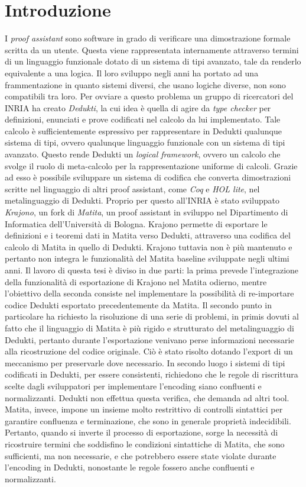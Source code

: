 \documentclass[12pt,a4paper]{report}
\begin{document}
\chapter*{Introduzione}
I \textit{proof assistant} sono software in grado di verificare una dimostrazione
formale scritta da un utente. Questa viene rappresentata internamente attraverso 
termini di un linguaggio funzionale dotato di un sistema di tipi avanzato, tale
da renderlo equivalente a una logica. Il loro sviluppo negli anni ha portato ad una frammentazione
in quanto sistemi diversi, che usano logiche diverse, non sono compatibili tra 
loro. Per ovviare a questo problema un gruppo di ricercatori del INRIA ha creato
\textit{Dedukti}, la cui idea è quella di agire da \textit{type checker} per definizioni, enunciati e prove codificati
nel calcolo da lui implementato. Tale calcolo è sufficientemente espressivo 
per rappresentare in Dedukti qualunque sistema di tipi, ovvero qualunque linguaggio
funzionale con un sistema di tipi avanzato. Questo rende Dedukti un \textit{logical 
framework}, ovvero un calcolo che svolge il ruolo di meta-calcolo per la rappresentazione
uniforme di calcoli. Grazie ad esso è possibile sviluppare un sistema di codifica che
converta dimostrazioni scritte nel linguaggio di altri proof assistant, come \textit{Coq} e \textit{HOL lite},
nel metalinguaggio di Dedukti. Proprio per questo all'INRIA è stato sviluppato \textit{Krajono}, un
fork di \textit{Matita}, un proof assistant in sviluppo nel Dipartimento 
di Informatica dell'Università di Bologna. Krajono permette di esportare le definizioni
e i teoremi dati in Matita verso Dedukti, attraverso una codifica del calcolo
di Matita in quello di Dedukti. Krajono tuttavia non è più mantenuto e pertanto non integra
le funzionalità del Matita baseline sviluppate negli ultimi anni. 
Il lavoro di questa tesi è diviso in due parti: la prima prevede l'integrazione della 
funzionalità di esportazione di Krajono nel Matita odierno, mentre l'obiettivo della seconda
consiste nel implementare la possibilità di re-importare
codice Dedukti esportato precedentemente da Matita. Il secondo punto in particolare 
ha richiesto la risoluzione di una serie di problemi, in primis dovuti al fatto che
il linguaggio di Matita è più rigido e strutturato del metalinguaggio di Dedukti,
pertanto durante l'esportazione venivano perse informazioni necessarie alla
ricostruzione del codice originale. Ciò è stato risolto dotando l'export di
un meccanismo per preservarle dove necessario. In secondo luogo i sistemi di tipi
codificati in Dedukti, per essere consistenti, richiedono che le regole di riscrittura
scelte dagli sviluppatori per implementare l'encoding siano confluenti e normalizzanti.
Dedukti non effettua questa verifica, che demanda ad altri tool. Matita, invece, impone
un insieme molto restrittivo di controlli sintattici per garantire confluenza e terminazione,
che sono in generale proprietà indecidibili. Pertanto, quando si inverte il processo di
esportazione, sorge la necessità di ricostruire termini che soddisfino le condizioni 
sintattiche di Matita, che sono sufficienti, ma non necessarie, e che potrebbero essere
state violate durante l'encoding in Dedukti, nonostante le regole fossero anche confluenti
e normalizzanti.
\end{document}
